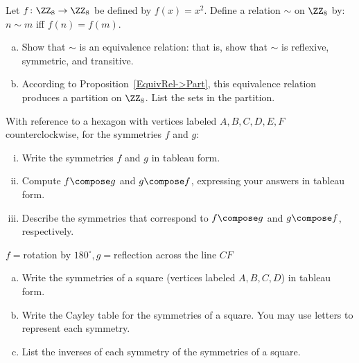 \begin{exercise}\label{exercise:TestPractice:66}
Let $f\colon \ZZ_8 \to \ZZ_8$ be defined by $f(x) =  x^2 $. Define a relation $\sim$ on $\ZZ_8$ by: $n \sim m$ iff $f(n) = f(m)$.
\begin{enumerate}[(a)]
\item
Show that $\sim$ is an equivalence relation: that is, show that $\sim$ is reflexive, symmetric, and transitive.
\item
According to Proposition~\ref{EquivRel->Part}, this equivalence relation produces a partition on  $\ZZ_8$. List the sets in the partition.
\end{enumerate}
\end{exercise}

\begin{exercise}\label{exercise:TestPractice:16}
With reference to a hexagon with vertices labeled $A,B,C,D,E,F$ counterclockwise, for the symmetries $f$ and $g$:
\begin{enumerate}[(i)]
\item
Write the symmetries $f$ and $g$ in tableau form.
\item
Compute $f \compose g$ and $g \compose f$, expressing your answers in tableau form.
\item 
Describe the symmetries that correspond to $f \compose g$ and $g \compose f$, respectively.
\end{enumerate}
\medskip
$f=$rotation by $ 180^\circ, g=$reflection across the line $CF$
\end{exercise}

\bigskip
\begin{exercise}
\begin{enumerate}[(a)]
\item
Write the symmetries of a square (vertices labeled $A,B,C,D$) in tableau form.
\item
Write the Cayley table for the symmetries of a square. You may use letters to represent each symmetry. 
\item
List the inverses of each symmetry of the symmetries of a square.
\end{enumerate}
\end{exercise}